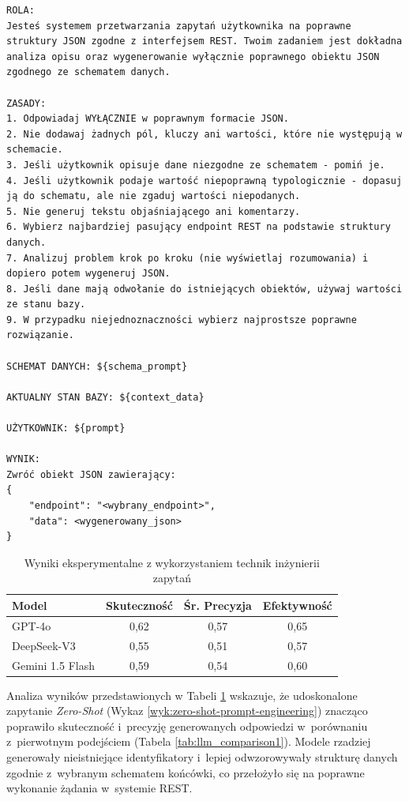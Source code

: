 \begin{lstlisting}[caption={Struktura zapytania z wykorzystaniem technik inżynierii zapytań.}, label={wyk:zero-shot-prompt-engineering}]
ROLA:
Jesteś systemem przetwarzania zapytań użytkownika na poprawne struktury JSON zgodne z interfejsem REST. Twoim zadaniem jest dokładna analiza opisu oraz wygenerowanie wyłącznie poprawnego obiektu JSON zgodnego ze schematem danych.

ZASADY:
1. Odpowiadaj WYŁĄCZNIE w poprawnym formacie JSON.
2. Nie dodawaj żadnych pól, kluczy ani wartości, które nie występują w schemacie.
3. Jeśli użytkownik opisuje dane niezgodne ze schematem - pomiń je.
4. Jeśli użytkownik podaje wartość niepoprawną typologicznie - dopasuj ją do schematu, ale nie zgaduj wartości niepodanych.
5. Nie generuj tekstu objaśniającego ani komentarzy.
6. Wybierz najbardziej pasujący endpoint REST na podstawie struktury danych.
7. Analizuj problem krok po kroku (nie wyświetlaj rozumowania) i dopiero potem wygeneruj JSON.
8. Jeśli dane mają odwołanie do istniejących obiektów, używaj wartości ze stanu bazy.
9. W przypadku niejednoznaczności wybierz najprostsze poprawne rozwiązanie.

SCHEMAT DANYCH: ${schema_prompt}

AKTUALNY STAN BAZY: ${context_data}

UŻYTKOWNIK: ${prompt}

WYNIK:
Zwróć obiekt JSON zawierający:
{
    "endpoint": "<wybrany_endpoint>",
    "data": <wygenerowany_json>
}
\end{lstlisting}

\begin{table}[h!]
\centering
\caption{Wyniki eksperymentalne z wykorzystaniem technik inżynierii zapytań}
\label{tab:llm_comparison2}
\begin{tabular}{|l|c|c|c|}
\hline
\textbf{Model} & \textbf{Skuteczność} & \textbf{Śr. Precyzja} & \textbf{Efektywność} \\ \hline
GPT-4o & 0,62 & 0,57 & 0,65 \\ \hline
DeepSeek-V3 & 0,55 & 0,51 & 0,57 \\ \hline
Gemini 1.5 Flash & 0,59 & 0,54 & 0,60 \\ \hline
\end{tabular}
\end{table}

Analiza wyników przedstawionych w Tabeli \ref{tab:llm_comparison2} wskazuje, że udoskonalone zapytanie \textit{Zero-Shot} (Wykaz \ref{wyk:zero-shot-prompt-engineering}) znacząco poprawiło skuteczność i~precyzję generowanych odpowiedzi w~porównaniu z~pierwotnym podejściem (Tabela \ref{tab:llm_comparison1}). Modele rzadziej generowały nieistniejące identyfikatory i~lepiej odwzorowywały strukturę danych zgodnie z~wybranym schematem końcówki, co przełożyło się na poprawne wykonanie żądania w~systemie REST.


